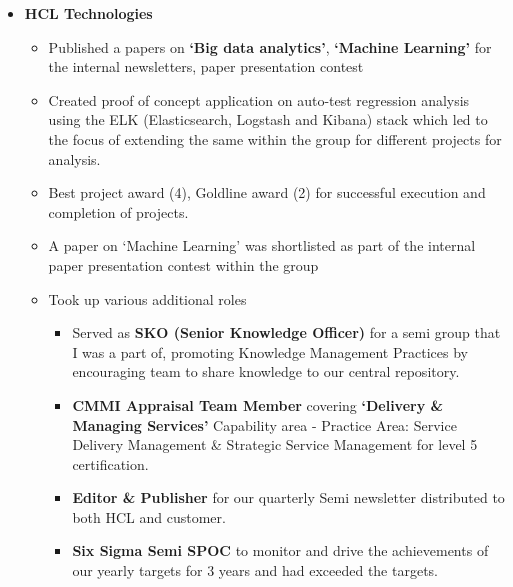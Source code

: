 \documentclass[a4paper,12pt]{article}
\begin{document}
\begin{itemize}
  \item{\bf{HCL Technologies}}
    
    \begin{itemize}
      \setlength\itemsep{-0.5em}

    \item Published a papers on \textbf{`Big data analytics'},
      \textbf{`Machine Learning'} for the internal newsletters, paper
      presentation contest

    \item Created proof of concept application on auto-test
      regression analysis using the ELK (Elasticsearch, Logstash and
      Kibana) stack which led to the focus of extending the same
      within the group for different projects for analysis.

    \item Best project award (4), Goldline award (2) for successful
      execution and completion of projects.
      
    \item A paper on `Machine Learning' was shortlisted as part of
      the internal paper presentation contest within the group
      
    \item Took up various additional roles
      \begin{itemize}
      \setlength\itemsep{-0.5em}
        
      \item Served as \textbf{SKO (Senior Knowledge Officer)} for a
        semi group that I was a part of, promoting Knowledge
        Management Practices by encouraging team to share knowledge to
        our central repository.

      \item \textbf{CMMI Appraisal Team Member} covering
        \textbf{`Delivery \& Managing Services'} Capability area -
        Practice Area: Service Delivery Management \& Strategic
        Service Management for level 5 certification.

      \item \textbf{Editor \& Publisher} for our quarterly Semi
        newsletter distributed to both HCL and customer.
        
      \item \textbf{Six Sigma Semi SPOC} to monitor and drive the
        achievements of our yearly targets for 3 years and had
        exceeded the targets.


\end{itemize}
\end{itemize}
\end{itemize}
\end{document}
